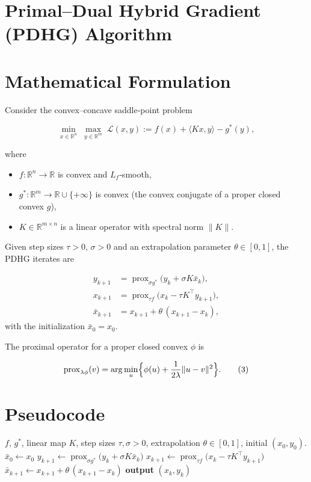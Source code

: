 \documentclass{article}
\newcommand{\prox}{\operatorname{prox}}
\begin{document}
\section*{Primal–Dual Hybrid Gradient (PDHG) Algorithm}

\section*{Mathematical Formulation}
Consider the convex–concave saddle‑point problem  

\[
\min_{x\in\mathbb R^{n}}\;\max_{y\in\mathbb R^{m}} \; \mathcal L(x,y)
:= f(x)+\langle Kx , y\rangle - g^{*}(y),
\tag{1}
\]

where  

\begin{itemize}
  \item $f:\mathbb R^{n}\!\to\!\mathbb R$ is convex and $L_f$‑smooth,
  \item $g^{*}:\mathbb R^{m}\!\to\!\mathbb R\cup\{+\infty\}$ is convex (the convex conjugate of a proper closed convex $g$),
  \item $K\in\mathbb R^{m\times n}$ is a linear operator with spectral norm $\|K\|$.
\end{itemize}

Given step sizes $\tau>0$, $\sigma>0$ and an extrapolation parameter $\theta\in[0,1]$, the PDHG iterates are  

\[
\begin{aligned}
y_{k+1}&=\prox_{\sigma g^{*}}\!\bigl(y_{k}+\sigma K\bar x_{k}\bigr), \tag{2a}\\[2mm]
x_{k+1}&=\prox_{\tau f}\!\bigl(x_{k}-\tau K^{\top}y_{k+1}\bigr), \tag{2b}\\[2mm]
\bar x_{k+1}&=x_{k+1}+\theta\,(x_{k+1}-x_{k}), \tag{2c}
\end{aligned}
\]
with the initialization $\bar x_{0}=x_{0}$.

The proximal operator for a proper closed convex $\phi$ is  

\[
\prox_{\lambda \phi}(v)=\arg\min_{u}\Bigl\{\phi(u)+\frac{1}{2\lambda}\|u-v\|^{2}\Bigr\}.
\tag{3}
\]

\section*{Pseudocode}
\begin{algorithm}[H]
\caption{Primal–Dual Hybrid Gradient (PDHG)}\label{alg:PDHG}
\begin{algorithmic}[1]
\Require $f$, $g^{*}$, linear map $K$, step sizes $\tau,\sigma>0$, extrapolation $\theta\in[0,1]$, initial $(x_{0},y_{0})$.
\State $\bar x_{0}\gets x_{0}$
    \State $y_{k+1}\gets\prox_{\sigma g^{*}}\!\bigl(y_{k}+\sigma K\bar x_{k}\bigr)$ 
    \State $x_{k+1}\gets\prox_{\tau f}\!\bigl(x_{k}-\tau K^{\top}y_{k+1}\bigr)$ 
    \State $\bar x_{k+1}\gets x_{k+1}+\theta\,(x_{k+1}-x_{k})$ 
\EndFor
\State \textbf{output} $(x_{k},y_{k})$
\end{algorithmic}
\end{algorithm}
\end{document}
